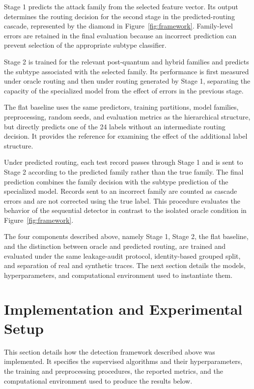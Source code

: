 \documentclass{IEEEoj}
\begin{document}
Stage 1 predicts the attack family from the selected feature vector. Its output
determines the routing decision for the second stage in the predicted-routing
cascade, represented by the diamond in Figure~\ref{fig:framework}. Family-level
errors are retained in the final evaluation because an incorrect prediction
can prevent selection of the appropriate subtype classifier.

Stage 2 is trained for the relevant post-quantum and hybrid families and
predicts the subtype associated with the selected family. Its performance is
first measured under oracle routing and then under routing generated by Stage
1, separating the capacity of the specialized model from the effect of errors
in the previous stage.

The flat baseline uses the same predictors, training partitions, model families,
preprocessing, random seeds, and evaluation metrics as the hierarchical
structure, but directly predicts one of the 24 labels without an intermediate
routing decision. It provides the reference for examining the effect of the
additional label structure.

Under predicted routing, each test record passes through Stage 1 and is sent to
Stage 2 according to the predicted family rather than the true family. The
final prediction combines the family decision with the subtype prediction of
the specialized model. Records sent to an incorrect family are counted as
cascade errors and are not corrected using the true label. This procedure
evaluates the behavior of the sequential detector in contrast to the isolated
oracle condition in Figure~\ref{fig:framework}.

The four components described above, namely Stage 1, Stage 2, the flat
baseline, and the distinction between oracle and predicted routing, are trained
and evaluated under the same leakage-audit protocol, identity-based grouped split,
and separation of real and synthetic traces. The next section details the
models, hyperparameters, and computational environment used to instantiate
them.
\section{Implementation and Experimental Setup}
\label{sec:models}
This section details how the detection framework described above was
implemented. It specifies the supervised algorithms and their hyperparameters,
the training and preprocessing procedures, the reported metrics, and the
computational environment used to produce the results below.
\end{document}
